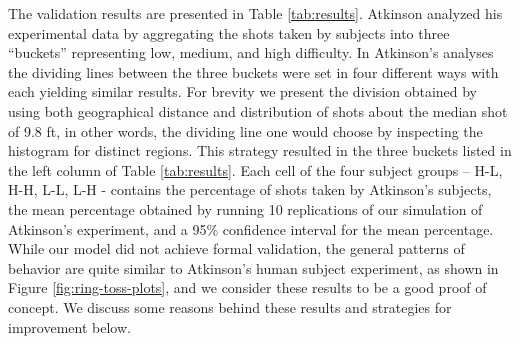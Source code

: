 The validation results are presented in Table \ref{tab:results}. Atkinson analyzed his experimental data by aggregating the shots taken by subjects into three ``buckets'' representing low, medium, and high difficulty.  In Atkinson's analyses the dividing lines between the three buckets were set in four different ways with each yielding similar results.  For brevity we present the division obtained by using both geographical distance and distribution of shots about the median shot of 9.8 ft, in other words, the dividing line one would choose by inspecting the histogram for distinct regions.  This strategy resulted in the three buckets listed in the left column of Table \ref{tab:results}.  Each cell of the four subject groups -- H-L, H-H, L-L, L-H - contains the percentage of shots taken by Atkinson's subjects, the mean percentage obtained by running 10 replications of our simulation of Atkinson's experiment, and a 95\% confidence interval for the mean percentage.  While our model did not achieve formal validation, the general patterns of behavior are quite similar to Atkinson's human subject experiment, as shown in Figure \ref{fig:ring-toss-plots}, and we consider these results to be a good proof of concept.  We discuss some reasons behind these results and strategies for improvement below.


